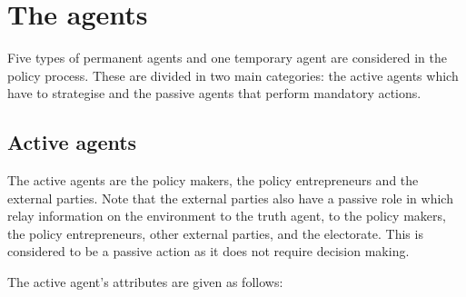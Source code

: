 \documentclass[11pt]{article}
\begin{document}
\section{The agents}
\label{sec:agents}

Five types of permanent agents and one temporary agent are considered in the policy process. These are divided in two main categories: the active agents which have to strategise and the passive agents  that perform mandatory actions.

\subsection{Active agents}
\label{ssec:activeAgents}

The active agents are the policy makers, the policy entrepreneurs and the external parties. Note that the external parties also have a passive role in which relay information on the environment to the truth agent, to the policy makers, the policy entrepreneurs, other external parties, and the electorate. This is considered to be a passive action as it does not require decision making.

The active agent's attributes are given as follows:
\end{document}
